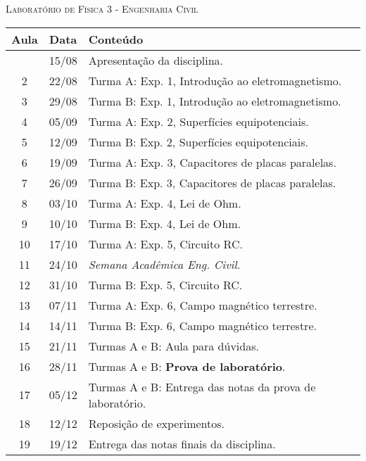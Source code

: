 \vspace{1cm}
\begin{center}
\Large\textsc{Laboratório de Física 3 - Engenharia Civil}
\end{center}

\begin{center}
\begin{longtable}{ccp{70mm}}
\toprule
Aula & Data & Conteúdo \\
\midrule
\endhead
\bottomrule
\endfoot
1 & 15/08 & Apresentação da disciplina. \\
2 & 22/08 & Turma A: Exp. 1, Introdução ao eletromagnetismo. \\
3 & 29/08 & Turma B: Exp. 1, Introdução ao eletromagnetismo. \\
4 & 05/09 & Turma A: Exp. 2, Superfícies equipotenciais. \\
5 & 12/09 & Turma B: Exp. 2, Superfícies equipotenciais. \\
6 & 19/09 & Turma A: Exp. 3, Capacitores de placas paralelas. \\
7 & 26/09 & Turma B: Exp. 3, Capacitores de placas paralelas. \\
8 & 03/10 & Turma A: Exp. 4, Lei de Ohm. \\
9 & 10/10 & Turma B: Exp. 4, Lei de Ohm. \\
10 & 17/10 & Turma A: Exp. 5, Circuito RC. \\
11 & 24/10 & \emph{Semana Acadêmica Eng. Civil.} \\
12 & 31/10 & Turma B: Exp. 5, Circuito RC. \\
13 & 07/11 & Turma A: Exp. 6, Campo magnético terrestre. \\
14 & 14/11 & Turma B: Exp. 6, Campo magnético terrestre. \\
15 & 21/11 & Turmas A e B: Aula para dúvidas. \\
16 & 28/11 & Turmas A e B: \textbf{Prova de laboratório}. \\
17 & 05/12 & Turmas A e B: Entrega das notas da prova de laboratório. \\ 
18 & 12/12 & Reposição de experimentos. \\
19 & 19/12 & Entrega das notas finais da disciplina. \\
\end{longtable}
\end{center}

\clearpage


